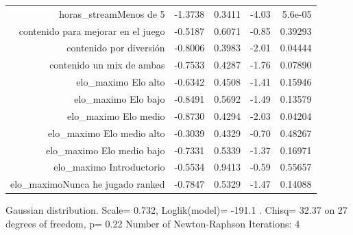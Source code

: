 \documentclass[pdf]{beamer}
\begin{document}
\begin{frame}
\begin{center}
\begin{tiny}
\begin{table}[ht]
\begin{tabular}{rrrrr}
$$horas\_streamMenos de 5                  &                   -1.3738  &    0.3411 & -4.03 & 5.6e-05\\
contenido para mejorar en el juego &                         -0.5187  &    0.6071  &-0.85 & 0.39293\\
contenido por diversión               &                      -0.8006    &  0.3983  &-2.01 & 0.04444\\
contenido un mix de ambas                &                   -0.7533   &   0.4287 &-1.76 & 0.07890\\
elo\_maximo Elo alto                  &                       -0.6342    & 0.4508  &-1.41  &0.15946\\
elo\_maximo Elo bajo              &                           -0.8491  &    0.5692  &-1.49 & 0.13579\\
elo\_maximo Elo medio          &                              -0.8730    &  0.4294  &-2.03 & 0.04204\\
elo\_maximo Elo medio alto                  &                 -0.3039   &   0.4329 & -0.70 & 0.48267\\
elo\_maximo Elo medio bajo          &                         -0.7331   &   0.5339  &-1.37  &0.16971\\
elo\_maximo Introductorio               &                     -0.5534    &  0.9413  &-0.59  &0.55657\\
elo\_maximoNunca he jugado ranked        &                   -0.7847     & 0.5329  &-1.47  &0.14088\\
    \hline
   \end{tabular}
   \end{table}
\tiny{Gaussian distribution. Scale= 0.732, Loglik(model)= -191.1 . Chisq= 32.37 on 27 degrees of freedom, p= 0.22  Number of Newton-Raphson Iterations: 4}
\end{tiny}
\end{center} 


\end{frame}
\end{document}
